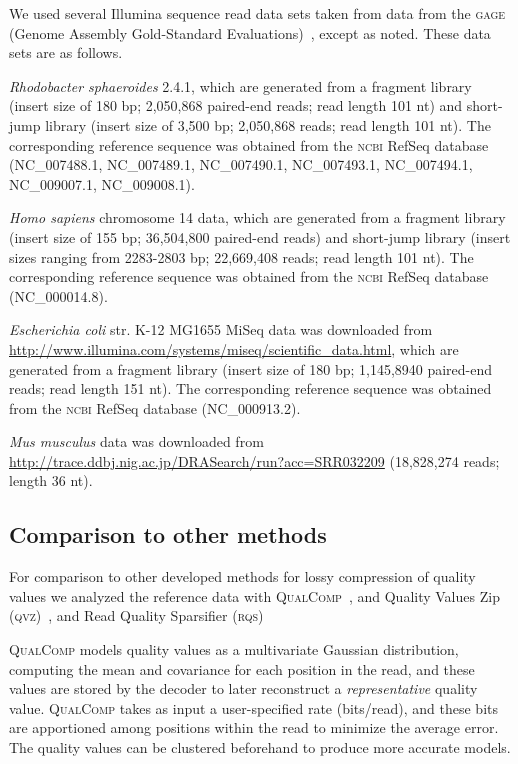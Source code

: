 \documentclass[fleqn,10pt,lineno]{wlpeerj} %
\begin{document}
We used several Illumina sequence read data sets taken from data from
the \textsc{gage} (Genome Assembly Gold-Standard
Evaluations)~\citep{Salzberg:2012rc}, except as noted. These data sets
are as follows.

\textit{Rhodobacter sphaeroides} 2.4.1, which are generated from a
fragment library (insert size of 180 bp; 2,050,868 paired-end reads;
read length 101 nt) and short-jump library (insert size of 3,500 bp;
2,050,868 reads; read length 101 nt). The corresponding reference
sequence was obtained from the \textsc{ncbi} RefSeq database
(NC\_007488.1, NC\_007489.1, NC\_007490.1, NC\_007493.1, NC\_007494.1,
NC\_009007.1, NC\_009008.1).

\textit{Homo sapiens} chromosome 14 data, which are generated from a
fragment library (insert size of 155 bp; 36,504,800 paired-end reads)
and short-jump library (insert sizes ranging from 2283-2803 bp;
22,669,408 reads; read length 101 nt). The corresponding reference
sequence was obtained from the \textsc{ncbi} RefSeq database
(NC\_000014.8).

\textit{Escherichia coli} str. K-12 MG1655 MiSeq data was downloaded
from \url{http://www.illumina.com/systems/miseq/scientific_data.html},
which are generated from a fragment library (insert size of 180 bp;
1,145,8940 paired-end reads; read length 151 nt). The corresponding
reference sequence was obtained from the \textsc{ncbi} RefSeq database
(NC\_000913.2).

\textit{Mus musculus} data was downloaded from
\url{http://trace.ddbj.nig.ac.jp/DRASearch/run?acc=SRR032209}
(18,828,274 reads; length 36 nt).

\subsection*{Comparison to other methods}

For comparison to other developed methods for lossy compression of
quality values we analyzed the reference data with
\textsc{QualComp}~\citep{Ochoa:2013rt}, and Quality Values Zip
(\textsc{qvz)}~\citep{Malysa01102015}, and Read Quality Sparsifier
(\textsc{rqs})~\citep{DBLP:conf/recomb/YuYB14}

\textsc{QualComp} models quality values as a multivariate Gaussian
distribution, computing the mean and covariance for each position in
the read, and these values are stored by the decoder to later
reconstruct a \emph{representative} quality value. \textsc{QualComp}
takes as input a user-specified rate (bits/read), and these bits are
apportioned among positions within the read to minimize the average
error. The quality values can be clustered beforehand to produce more
accurate models.
\end{document}

